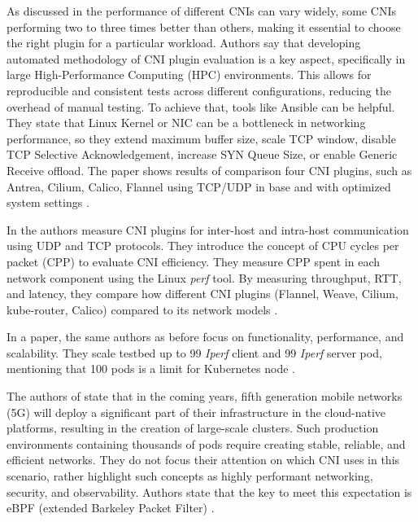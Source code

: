 As discussed in \cite{dakic2024performance} the performance of different CNIs can vary widely, some CNIs performing two to three times better than others, making it essential to choose the right plugin for a particular workload. Authors say that developing automated methodology of CNI plugin evaluation is a key aspect, specifically in large High-Performance Computing (HPC) environments. This allows for reproducible and consistent tests across different configurations, reducing the overhead of manual testing. To achieve that, tools like Ansible can be helpful. They state that Linux Kernel or NIC can be a bottleneck in networking performance, so they extend maximum buffer size, scale TCP window, disable TCP Selective Acknowledgement, increase SYN Queue Size, or enable Generic Receive offload. The paper shows results of comparison four CNI plugins, such as Antrea, Cilium, Calico, Flannel using TCP/UDP in base and with optimized system settings \cite{dakic2024performance}. 

In \cite{9153266} the authors measure CNI plugins for inter-host and intra-host communication using UDP and TCP protocols. They introduce the concept of CPU cycles per packet (CPP) to evaluate CNI efficiency. They measure CPP spent in each network component using the Linux \textit{perf} tool. By measuring throughput, RTT, and latency, they compare how different CNI plugins (Flannel, Weave, Cilium, kube-router, Calico) compared to its network models \cite{9153266}. 

In a paper, the same authors as before focus on functionality, performance, and scalability. They scale testbed up to 99 \textit{Iperf} client and 99 \textit{Iperf} server pod, mentioning that 100 pods is a limit for Kubernetes node \cite{9309003}. 

The authors of \cite{10138542} state that in the coming years, fifth generation mobile networks (5G) will deploy a significant part of their infrastructure in the cloud-native platforms, resulting in the creation of large-scale clusters. Such production environments containing thousands of pods require creating stable, reliable, and efficient networks. They do not focus their attention on which CNI uses in this scenario, rather highlight such concepts as highly performant networking, security, and observability. Authors state that the key to meet this expectation is eBPF (extended Barkeley Packet Filter) \cite{10138542}. 
